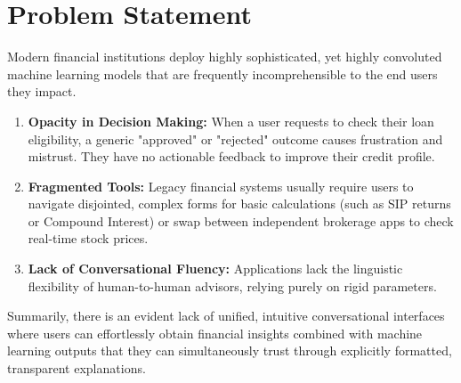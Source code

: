 \documentclass[12pt,a4paper]{report}
\begin{document}
\section{Problem Statement}
Modern financial institutions deploy highly sophisticated, yet highly convoluted machine learning models that are frequently incomprehensible to the end users they impact.
\begin{enumerate}
    \item \textbf{Opacity in Decision Making:} When a user requests to check their loan eligibility, a generic "approved" or "rejected" outcome causes frustration and mistrust. They have no actionable feedback to improve their credit profile.
    \item \textbf{Fragmented Tools:} Legacy financial systems usually require users to navigate disjointed, complex forms for basic calculations (such as SIP returns or Compound Interest) or swap between independent brokerage apps to check real-time stock prices.
    \item \textbf{Lack of Conversational Fluency:} Applications lack the linguistic flexibility of human-to-human advisors, relying purely on rigid parameters. 
\end{enumerate}
Summarily, there is an evident lack of unified, intuitive conversational interfaces where users can effortlessly obtain financial insights combined with machine learning outputs that they can simultaneously trust through explicitly formatted, transparent explanations.
\end{document}
